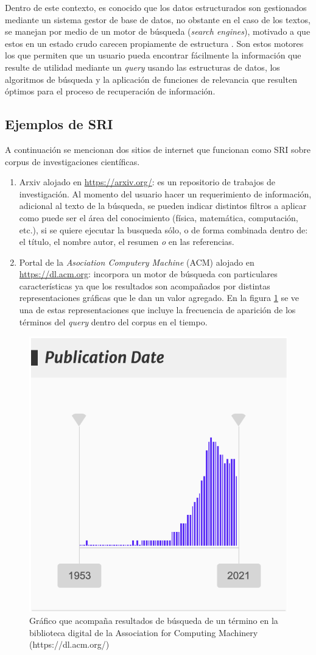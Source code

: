 \documentclass[
  12pt,
  openany]{book}
\begin{document}
Dentro de este contexto, es conocido que los datos estructurados son gestionados mediante un sistema gestor de base de datos, no obstante en el caso de los textos, se manejan por medio de un motor de búsqueda (\emph{search engines}), motivado a que estos en un estado crudo carecen propiamente de estructura \citep{miningt2012}. Son estos motores los que permiten que un usuario pueda encontrar fácilmente la información que resulte de utilidad mediante un \emph{query} usando las estructuras de datos, los algoritmos de búsqueda y la aplicación de funciones de relevancia que resulten óptimos para el proceso de recuperación de información.

\hypertarget{ejemplos-de-sri}{%
\subsection{Ejemplos de SRI}\label{ejemplos-de-sri}}

A continuación se mencionan dos sitios de internet que funcionan como SRI sobre corpus de investigaciones científicas.

\begin{enumerate}
\def\labelenumi{\arabic{enumi}.}
\item
  Arxiv alojado en \url{https://arxiv.org/}: es un repositorio de trabajos de investigación. Al momento del usuario hacer un requerimiento de información, adicional al texto de la búsqueda, se pueden indicar distintos filtros a aplicar como puede ser el área del conocimiento (física, matemática, computación, etc.), si se quiere ejecutar la busqueda sólo, o de forma combinada dentro de: el título, el nombre autor, el resumen \emph{o} en las referencias.
\item
  Portal de la \emph{Asociation Computery Machine} (ACM) alojado en \url{https://dl.acm.org}: incorpora un motor de búsqueda con particulares características ya que los resultados son acompañados por distintas representaciones gráficas que le dan un valor agregado. En la figura \ref{fig:busquedasacm} se ve una de estas representaciones que incluye la frecuencia de aparición de los términos del \emph{query} dentro del corpus en el tiempo.
\end{enumerate}

\begin{figure}

{\centering \includegraphics[width=0.3\linewidth]{images/03-marco-teorico/busquedaacm} 

}

\caption{Gráfico que acompaña resultados de búsqueda de un término en la biblioteca digital de la Association for Computing Machinery (https://dl.acm.org/)}\label{fig:busquedasacm}
\end{figure}
\end{document}
